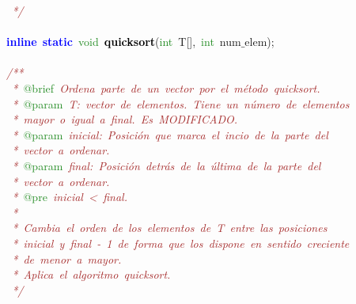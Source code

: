 \mbox{}\textit{\textcolor{Brown}{\ */}} \\
\mbox{} \\
\mbox{}\textbf{\textcolor{Blue}{inline}}\ \textbf{\textcolor{Blue}{static}}\ \textcolor{ForestGreen}{void}\ \textbf{\textcolor{Black}{quicksort}}\textcolor{BrickRed}{(}\textcolor{ForestGreen}{int}\ T\textcolor{BrickRed}{[],}\ \textcolor{ForestGreen}{int}\ num$\_$elem\textcolor{BrickRed}{);} \\
\mbox{} \\
\mbox{}\textit{\textcolor{Brown}{/**}} \\
\mbox{}\textit{\textcolor{Brown}{\ *\ }}\textcolor{ForestGreen}{@brief}\textit{\textcolor{Brown}{\ Ordena\ parte\ de\ un\ vector\ por\ el\ método\ quicksort.}} \\
\mbox{}\textit{\textcolor{Brown}{\ *\ }}\textcolor{ForestGreen}{@param}\textit{\textcolor{Brown}{\ T:\ vector\ de\ elementos.\ Tiene\ un\ número\ de\ elementos\ }} \\
\mbox{}\textit{\textcolor{Brown}{\ *\ mayor\ o\ igual\ a\ final.\ Es\ MODIFICADO.}} \\
\mbox{}\textit{\textcolor{Brown}{\ *\ }}\textcolor{ForestGreen}{@param}\textit{\textcolor{Brown}{\ inicial:\ Posición\ que\ marca\ el\ incio\ de\ la\ parte\ del}} \\
\mbox{}\textit{\textcolor{Brown}{\ *\ vector\ a\ ordenar.}} \\
\mbox{}\textit{\textcolor{Brown}{\ *\ }}\textcolor{ForestGreen}{@param}\textit{\textcolor{Brown}{\ final:\ Posición\ detrás\ de\ la\ última\ de\ la\ parte\ del}} \\
\mbox{}\textit{\textcolor{Brown}{\ *\ vector\ a\ ordenar.\ }} \\
\mbox{}\textit{\textcolor{Brown}{\ *\ }}\textcolor{ForestGreen}{@pre}\textit{\textcolor{Brown}{\ inicial\ \textless{}\ final.}} \\
\mbox{}\textit{\textcolor{Brown}{\ *\ }} \\
\mbox{}\textit{\textcolor{Brown}{\ *\ Cambia\ el\ orden\ de\ los\ elementos\ de\ T\ entre\ las\ posiciones}} \\
\mbox{}\textit{\textcolor{Brown}{\ *\ inicial\ y\ final\ -\ 1\ de\ forma\ que\ los\ dispone\ en\ sentido\ creciente}} \\
\mbox{}\textit{\textcolor{Brown}{\ *\ de\ menor\ a\ mayor.}} \\
\mbox{}\textit{\textcolor{Brown}{\ *\ Aplica\ el\ algoritmo\ quicksort.}} \\
\mbox{}\textit{\textcolor{Brown}{\ */}} \\
